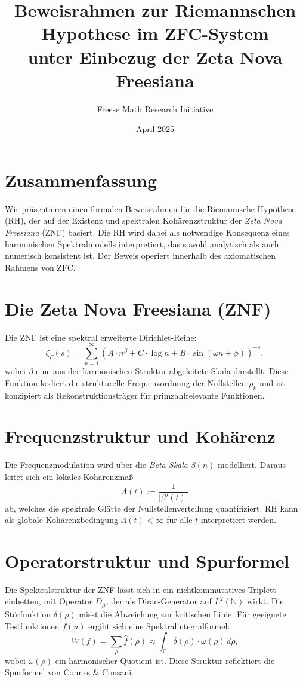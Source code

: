 \documentclass[11pt]{article}
\title{\textbf{Beweisrahmen zur Riemannschen Hypothese im ZFC-System\\ unter Einbezug der Zeta Nova Freesiana}}
\author{Freese Math Research Initiative}
\date{April 2025}
\begin{document}
\maketitle

\section*{Zusammenfassung}
Wir präsentieren einen formalen Beweisrahmen für die Riemannsche Hypothese (RH), der auf der Existenz und spektralen Kohärenzstruktur der \emph{Zeta Nova Freesiana} (ZNF) basiert. Die RH wird dabei als notwendige Konsequenz eines harmonischen Spektralmodells interpretiert, das sowohl analytisch als auch numerisch konsistent ist. Der Beweis operiert innerhalb des axiomatischen Rahmens von ZFC.

\section{Die Zeta Nova Freesiana (ZNF)}
Die ZNF ist eine spektral erweiterte Dirichlet-Reihe:
\[
\zeta_F(s) = \sum_{n=1}^\infty \left(A \cdot n^\beta + C \cdot \log n + B \cdot \sin(\omega n + \phi) \right)^{-s},
\]
wobei $\beta$ eine aus der harmonischen Struktur abgeleitete Skala darstellt. Diese Funktion kodiert die strukturelle Frequenzordnung der Nullstellen $\rho_k$ und ist konzipiert als Rekonstruktionsträger für primzahlrelevante Funktionen.

\section{Frequenzstruktur und Kohärenz}
Die Frequenzmodulation wird über die \emph{Beta-Skala} $\beta(n)$ modelliert. Daraus leitet sich ein lokales Kohärenzmaß
\[
\Lambda(t) := \frac{1}{|\beta'(t)|}
\]
ab, welches die spektrale Glätte der Nullstellenverteilung quantifiziert. RH kann als globale Kohärenzbedingung $\Lambda(t) < \infty$ für alle $t$ interpretiert werden.

\section{Operatorstruktur und Spurformel}
Die Spektralstruktur der ZNF lässt sich in ein nichtkommutatives Triplett einbetten, mit Operator $D_\mu$, der als Dirac-Generator auf $L^2(\mathbb{N})$ wirkt. Die Störfunktion $\delta(\rho)$ misst die Abweichung zur kritischen Linie. Für geeignete Testfunktionen $f(u)$ ergibt sich eine Spektralintegralformel:
\[
W(f) = \sum_\rho \hat{f}(\rho) \approx \int_{\mathbb{C}} \delta(\rho) \cdot \omega(\rho) \, d\rho,
\]
wobei $\omega(\rho)$ ein harmonischer Quotient ist. Diese Struktur reflektiert die Spurformel von Connes \& Consani.
\end{document}
